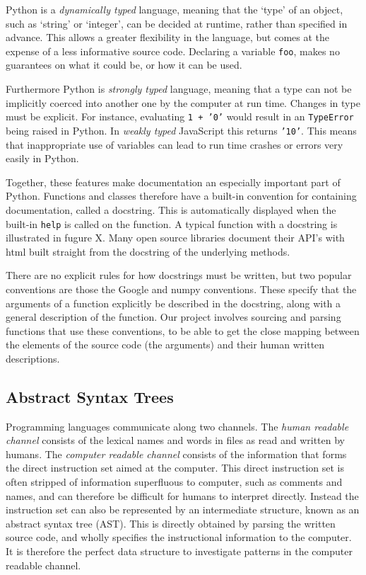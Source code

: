 Python is a \textit{dynamically typed} language, meaning that the `type' of an object, such as `string' or `integer', can be decided at runtime, rather than specified in advance.
This allows a greater flexibility in the language, but comes at the expense of a less informative source code.
Declaring a variable \texttt{foo}, makes no guarantees on what it could be, or how it can be used. 

Furthermore Python is \textit{strongly typed} language, meaning that a type can not be implicitly coerced into another one by the computer at run time. Changes in type must be explicit. For instance, evaluating \texttt{1 + '0'} would result in an \texttt{TypeError} being raised in Python. In \textit{weakly typed} JavaScript this returns \texttt{'10'}.
This means that inappropriate use of variables can lead to run time crashes or errors very easily in Python.

Together, these features make documentation an especially important part of Python. 
Functions and classes therefore have a built-in convention for containing documentation, called a docstring. 
This is automatically displayed when the built-in \texttt{help} is called on the function.
A typical function with a docstring is illustrated in fugure X. 
Many open source libraries document their API's with html built straight from the docstring of the underlying methods.

There are no explicit rules for how docstrings must be written, but two popular conventions are those the Google and numpy conventions. These specify that the arguments of a function explicitly be described in the docstring, along with a general description of the function.
Our project involves sourcing and parsing functions that use these conventions, to be able to get the close mapping between the elements of the source code (the arguments) and their human written descriptions. 


\subsection{Abstract Syntax Trees} %
\label{sub:abstract_syntax_trees}

Programming languages communicate along two channels\cite{allamanis_survey_2017}. The \textit{human readable channel} consists of the lexical names and words in files as read and written by humans.  The \textit{computer readable channel} consists of the information that forms the direct instruction set aimed at the computer.
This direct instruction set is often stripped of information superfluous to computer, such as comments and names, and can therefore be difficult for humans to interpret directly.
Instead the instruction set can also be represented by an intermediate structure, known as an abstract syntax tree (AST).
This is directly obtained by parsing the written source code, and wholly specifies the instructional information to the computer.
It is therefore the perfect data structure to investigate patterns in the computer readable channel.

